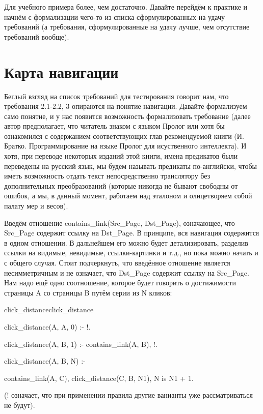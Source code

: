 \documentclass[a4paper]{book}
\def\td{т.\thinspace д.}
\begin{document}
Для учебного примера более, чем достаточно. Давайте перейдём к
практике и начнём с формализации чего-то из списка
сформулированных на удачу требований (а требования,
сформулированные на удачу лучше, чем отсутствие требований
вообще).

\section{Карта навигации}

Беглый взгляд на список требований для тестирования говорит нам,
что требования 2.1-2.2, 3 опираются на понятие навигации. Давайте
формализуем само понятие, и у нас появится возможность
формализовать требование (далее автор предполагает, что читатель
знаком с языком Пролог или хотя бы ознакомился с содержанием
соответствующих глав рекомендуемой книги
(И. Братко. Программирование на языке Пролог для исуственного
интеллекта). И хотя, при переводе некоторых изданий этой книги,
имена предикатов были переведены на русский язык, мы будем
называть предикаты по-английски, чтобы иметь возможность отдать
текст непосредственно транслятору без дополнительных
преобразований (которые никогда не бывают свободны от ошибок, а
мы, в данный момент, работаем над эталоном и олицетворяем собой
палату мер и весов).

Введём отношение contains\_link(Src\_Page, Dst\_Page),
означающее, что Src\_Page содержит ссылку на Dst\_Page. В
принципе, вся навигация содержится в одном отношении. В
дальнейшем его можно будет детализировать, разделив ссылки на
видимые, невидимые, ссылки-картинки и \td, но пока можно начать
и с общего случая. Стоит подчеркнуть, что введённое отношение
является несимметричным и не означает, что Dst\_Page содержит
ссылку на Src\_Page. Нам надо ещё одно соотношение, которое будет
говорить о достижимости страницы A со страницы B путём серии из N
кликов:

\begin{example}{click\_distance}{click_distance}

click_distance(A, A, 0) :- !.

click_distance(A, B, 1) :- contains_link(A, B), !.

click_distance(A, B, N) :-

                  contains_link(A, C),
                  click_distance(C, B, N1),
                  N is N1 + 1.
\end{example}

(! означает, что при применении правила другие ванианты уже
рассматриваться не будут).
\end{document}
